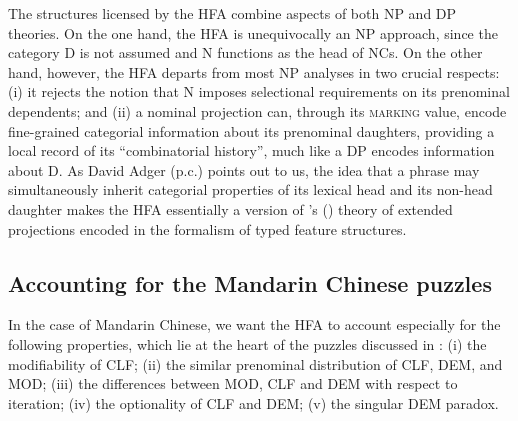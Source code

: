 \documentclass[output=paper,colorlinks,citecolor=brown]{langscibook}
\begin{document}
The structures licensed by the HFA combine aspects of both NP and DP theories. On the one hand, the HFA is unequivocally an NP approach, since the category D is not assumed and N functions as the head of NCs. On the other hand, however, the HFA departs from most NP analyses  in two crucial respects: (i) it rejects the notion that N imposes selectional requirements on its prenominal dependents; and (ii) a nominal projection can, through its \textsc{marking} value,  encode fine-grained categorial information about its prenominal daughters, providing a local record of its ``combinatorial history'', much like a DP encodes information about D. As David Adger (p.c.) points out to us, the idea that a  phrase may simultaneously inherit categorial properties of its lexical head and its non-head daughter makes the HFA  essentially a version of \citeauthor{Grimshaw91a}'s (\citeyear{Grimshaw91a})  theory of extended projections encoded in the formalism of typed feature structures.


\subsection{Accounting for the Mandarin Chinese puzzles}
\label{sec:solutionpuzzles:deng}


 In the case of Mandarin Chinese, we want the HFA to account especially for the following properties, which lie at the heart of the puzzles discussed in : 
(i) the modifiability of CLF; 
(ii) the similar prenominal distribution of CLF, DEM, and MOD;
(iii) the differences between MOD, CLF and DEM with respect to iteration; 
(iv) the optionality of CLF and DEM; %
(v) the singular DEM paradox.
 
%	
%
%	
%	
%	
%
\end{document}
